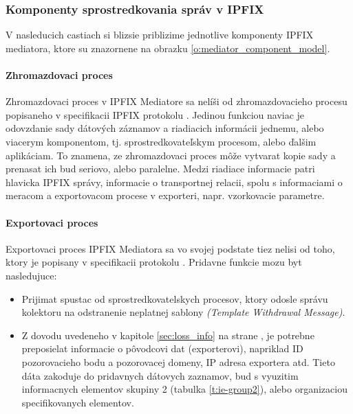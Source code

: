 

\subsubsection{Komponenty sprostredkovania správ v IPFIX}

V nasleducich castiach si blizsie priblizime jednotlive komponenty IPFIX mediatora, ktore su
znazornene na obrazku \ref{o:mediator_component_model}.

\paragraph{Zhromazdovaci proces}

Zhromazdovaci proces v IPFIX Mediatore sa nelíši od zhromazdovacieho procesu popisaneho v 
specifikacii IPFIX protokolu \citep{rfc5101}.
Jedinou funkciou naviac je odovzdanie sady dátových záznamov a riadiacich informácii jednemu, alebo 
viacerym komponentom, tj. sprostredkovateľskym procesom, alebo ďalšim aplikáciam. 
To znamena, ze zhromazdovaci proces môže vytvarat kopie sady a prenasat ich bud seriovo, alebo paralelne.  
Medzi riadiace informacie patri hlavicka IPFIX správy, informacie o transportnej relacii, 
spolu s informaciami o meracom a exportovacom procese v exporteri, napr. vzorkovacie parametre.

\paragraph{Exportovaci proces} \label{sec:exporting_process}

Exportovaci proces IPFIX Mediatora sa vo svojej podstate tiez nelisi od toho, ktory je popisany v specifikacii
protokolu \citep{rfc5101}.
Pridavne funkcie mozu byt nasledujuce:
\begin{itemize}
 \item Prijimat spustac od sprostredkovatelskych procesov, ktory odosle správu kolektoru na odstranenie 
 neplatnej sablony \emph{(Template Withdrawal Message)}.
 \item Z dovodu uvedeneho v kapitole \ref{sec:loss_info} na strane \pageref{sec:loss_info}, je potrebne 
 preposielat informacie o pôvodcovi dat (exporterovi), napriklad ID pozorovacieho bodu a pozorovacej 
 domeny, IP adresa exportera atd. Tieto dáta zakoduje do pridavnych dátovych zaznamov, bud s vyuzitim informacnych
 elementov skupiny 2 (tabulka \ref{t:ie-group2}), alebo organizaciou specifikovanych elementov.
\end{itemize}

